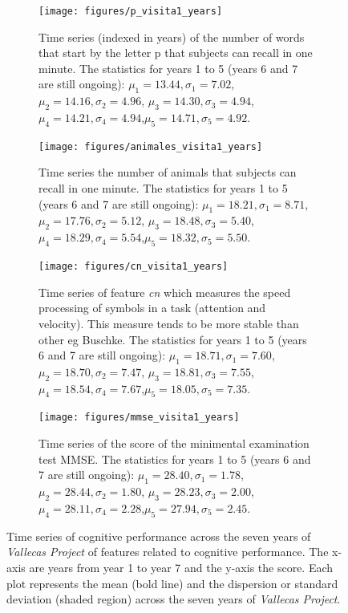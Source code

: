 \documentclass[11pt]{article}
\theoremstyle{definition}
\theoremstyle{remark}
\begin{document}
\begin{figure}[H]
    \centering
    \begin{subfigure}[t]{0.45\textwidth}
        \centering
        \texttt{[image: figures/p\_visita1\_years]}
        \caption{Time series (indexed in years) of the  number of words that start by the letter p that subjects can recall in one minute. The statistics for years 1 to 5 (years 6 and 7 are still ongoing): $\mu_{1}=13.44, \sigma_{1}=7.02$, $\mu_{2}=14.16, \sigma_{2}=4.96$, $\mu_{3}=14.30, \sigma_{3}=4.94$, $\mu_{4}=14.21, \sigma_{4}=4.94$,$\mu_{5}=14.71,\sigma_{5}=4.92$.}
    \end{subfigure}
    \hfill
    \begin{subfigure}[t]{0.45\textwidth}
        \centering
        \texttt{[image: figures/animales\_visita1\_years]}
        \caption{Time series the  number of animals that subjects can recall in one minute. The statistics for years 1 to 5 (years 6 and 7 are still ongoing): $\mu_{1}=18.21, \sigma_{1}=8.71$, $\mu_{2}=17.76, \sigma_{2}=5.12$, $\mu_{3}=18.48, \sigma_{3}=5.40$, $\mu_{4}=18.29, \sigma_{4}=5.54$,$\mu_{5}=18.32,\sigma_{5}=5.50$.}
    \end{subfigure}%
    
     \begin{subfigure}[t]{0.45\textwidth}
        \centering
        \texttt{[image: figures/cn\_visita1\_years]}
        \caption{Time series of feature \emph{cn} which measures the speed processing of symbols in a task (attention and velocity). This measure tends to be more stable than other eg Buschke. The statistics for years 1 to 5 (years 6 and 7 are still ongoing): $\mu_{1}=18.71, \sigma_{1}=7.60$, $\mu_{2}=18.70, \sigma_{2}=7.47$, $\mu_{3}=18.81, \sigma_{3}=7.55$, $\mu_{4}=18.54, \sigma_{4}=7.67$,$\mu_{5}=18.05,\sigma_{5}=7.35$.}
    \end{subfigure}
    \hfill
    \begin{subfigure}[t]{0.45\textwidth}
        \centering
        \texttt{[image: figures/mmse\_visita1\_years]}
        \caption{Time series of the score of the minimental examination test MMSE. The statistics for years 1 to 5 (years 6 and 7 are still ongoing): $\mu_{1}=28.40, \sigma_{1}=1.78$, $\mu_{2}=28.44, \sigma_{2}=1.80$, $\mu_{3}=28.23, \sigma_{3}=2.00$, $\mu_{4}=28.11, \sigma_{4}=2.28$,$\mu_{5}=27.94,\sigma_{5}=2.45$.}
    \end{subfigure}%
   
    \caption{Time series of cognitive performance across the seven years of \emph{Vallecas Project} of features related to cognitive performance. The x-axis are years from year 1 to year 7 and the y-axis the score. Each plot represents the mean (bold line) and the dispersion or standard deviation (shaded region) across the seven years of \emph{Vallecas Project}.}
    \label{fig:cogper4}
\end{figure}
\end{document}
